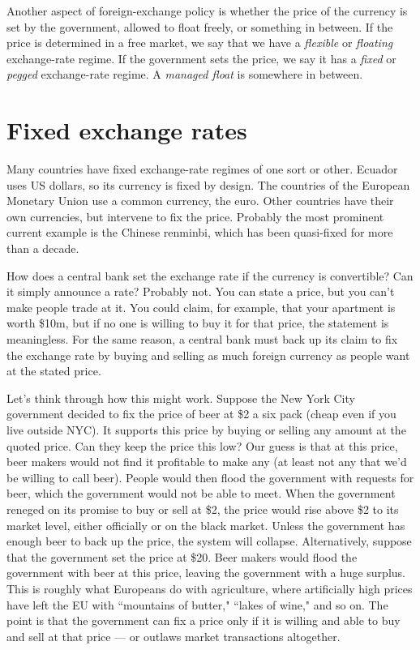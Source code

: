 Another aspect of foreign-exchange policy
is whether the price of the currency is set by the government,
allowed to float freely, or something in between.
If the price is determined in a free market, we say that we have a
{\it flexible\/} or {\it floating\/} exchange-rate regime. 
If the government sets the price, we say it has a
{\it fixed\/} or {\it pegged\/} exchange-rate regime. 
A {\it managed float\/} is somewhere in between. 


\section{Fixed exchange rates}

Many countries have fixed exchange-rate regimes of one sort or other.
Ecuador uses US dollars, so its currency is fixed by design. %
The countries of the European Monetary Union use a common currency, the euro.
Other countries have their own currencies, but intervene to
fix the price.
Probably the most prominent current example is the Chinese renminbi,
which has been quasi-fixed for more than a decade.


How does a central bank  set the exchange rate if the currency
 is convertible?
Can it simply announce a rate?
Probably not.
You can state a price, but you can't make people trade at it.
You could claim, for example, that your apartment is worth
\$10m, but if no one is willing to buy it for that price,
the statement is meaningless.
For the same reason, a central bank  must back up its
claim to fix the exchange rate by buying and selling as much
foreign currency as people want at the stated price.


Let's think through how this might work.
Suppose the New York City government decided to fix the price of beer at \$2 a six pack (cheap even if you live outside NYC).
It supports this price by buying or selling
any amount at the quoted price.  Can they keep the price this low?
Our guess is that at this price,
beer makers would not find it profitable to make any
(at least not any that we'd be willing to call beer).  People would then flood the government with requests for beer, which the government would
not be able to meet.  When the government reneged on its promise to buy or sell at \$2, the price
would rise above \$2 to its market level, either officially or on the black market.
Unless the government has enough beer to back up the price,
the system will collapse.
Alternatively, suppose that the government set the price at \$20.
Beer makers would flood the government with beer at this price, leaving the
government with a huge surplus.  This is roughly what Europeans do with agriculture, where artificially high prices have left the EU with
``mountains of butter," ``lakes of wine," and so on.
The point is that the government can fix a price
only if it is willing and able to buy and sell at that price --- or outlaws market transactions altogether.

